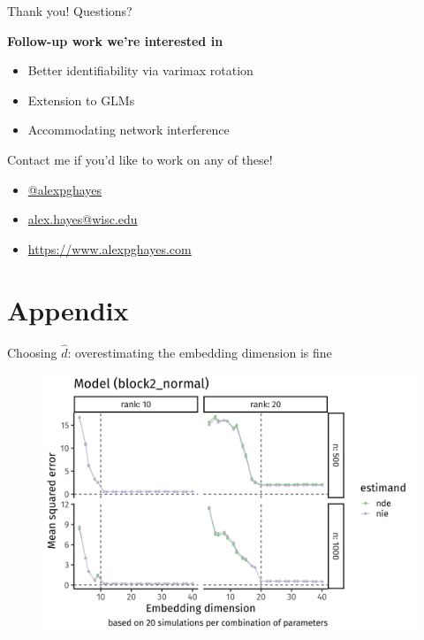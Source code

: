 \documentclass{beamer}
\theoremstyle{remark}
\begin{document}
\begin{frame}{Thank you! Questions?}

    \textbf{Follow-up work we're interested in}

    \begin{itemize}
        \item Better identifiability via varimax rotation
        \item Extension to GLMs
        \item Accommodating network interference
    \end{itemize}

    Contact me if you'd like to work on any of these!

    \begin{itemize}
        \item[]  \href{https://twitter.com/alexpghayes}{@alexpghayes}
        \item[]  \href{mailto:alex.hayes@wisc.edu}{alex.hayes@wisc.edu}
        \item[]  \url{https://www.alexpghayes.com}
    \end{itemize}

\end{frame}


\section{Appendix}

\begin{frame}{Choosing $\widehat{d}$: overestimating the embedding dimension is fine}

    \centering

    \begin{figure}
        \includegraphics[width=\textwidth]{figures/misspecification/block2_normal_misspecification_loss_average.png}
    \end{figure}

\end{frame}
\end{document}
